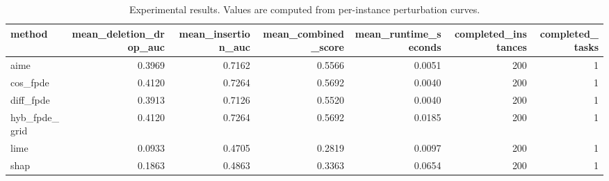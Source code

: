 \begin{table}[t]
\caption{Experimental results. Values are computed from per-instance perturbation curves.}
\label{tab:main_results_computed}
\centering
\begin{tabular}{lrrrrrr}
\toprule
method & mean\_deletion\_drop\_auc & mean\_insertion\_auc & mean\_combined\_score & mean\_runtime\_seconds & completed\_instances & completed\_tasks \\
\midrule
aime & 0.3969 & 0.7162 & 0.5566 & 0.0051 & 200 & 1 \\
cos\_fpde & 0.4120 & 0.7264 & 0.5692 & 0.0040 & 200 & 1 \\
diff\_fpde & 0.3913 & 0.7126 & 0.5520 & 0.0040 & 200 & 1 \\
hyb\_fpde\_grid & 0.4120 & 0.7264 & 0.5692 & 0.0185 & 200 & 1 \\
lime & 0.0933 & 0.4705 & 0.2819 & 0.0097 & 200 & 1 \\
shap & 0.1863 & 0.4863 & 0.3363 & 0.0654 & 200 & 1 \\
\bottomrule
\end{tabular}

\end{table}
